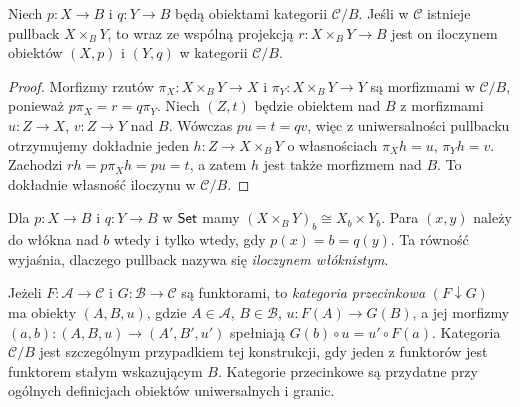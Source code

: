 \begin{stwierdzenie}
Niech $p:X\to B$ i $q:Y\to B$ będą obiektami kategorii $\mathcal C/B$. Jeśli w $\mathcal C$ istnieje pullback $X\times_B Y$, to wraz ze wspólną projekcją $r:X\times_B Y\to B$ jest on iloczynem obiektów $(X,p)$ i $(Y,q)$ w kategorii $\mathcal C/B$.
\end{stwierdzenie}
\begin{proof}
Morfizmy rzutów $\pi_X:X\times_B Y\to X$ i $\pi_Y:X\times_B Y\to Y$ są morfizmami w $\mathcal C/B$, ponieważ $p\pi_X=r=q\pi_Y$. Niech $(Z,t)$ będzie obiektem nad $B$ z morfizmami $u:Z\to X$, $v:Z\to Y$ nad $B$. Wówczas $pu=t=qv$, więc z uniwersalności pullbacku otrzymujemy dokładnie jeden $h:Z\to X\times_B Y$ o własnościach $\pi_Xh=u$, $\pi_Yh=v$. Zachodzi $rh=p\pi_Xh=pu=t$, a zatem $h$ jest także morfizmem nad $B$. To dokładnie własność iloczynu w $\mathcal C/B$.
\end{proof}

\begin{przyklad}
Dla $p:X\to B$ i $q:Y\to B$ w $\mathsf{Set}$ mamy $(X\times_B Y)_b\cong X_b\times Y_b$. Para $(x,y)$ należy do włókna nad $b$ wtedy i tylko wtedy, gdy $p(x)=b=q(y)$. Ta równość wyjaśnia, dlaczego pullback nazywa się \emph{iloczynem włóknistym}.
\end{przyklad}

\begin{uwaga}
Jeżeli $F:\mathcal A\to\mathcal C$ i $G:\mathcal B\to\mathcal C$ są funktorami, to \emph{kategoria przecinkowa} $(F\downarrow G)$ ma obiekty $(A,B,u)$, gdzie $A\in\mathcal A$, $B\in\mathcal B$, $u:F(A)\to G(B)$, a jej morfizmy $(a,b):(A,B,u)\to(A',B',u')$ spełniają $G(b)\circ u=u'\circ F(a)$. Kategoria $\mathcal C/B$ jest szczególnym przypadkiem tej konstrukcji, gdy jeden z funktorów jest funktorem stałym wskazującym $B$. Kategorie przecinkowe są przydatne przy ogólnych definicjach obiektów uniwersalnych i granic.
\end{uwaga}


